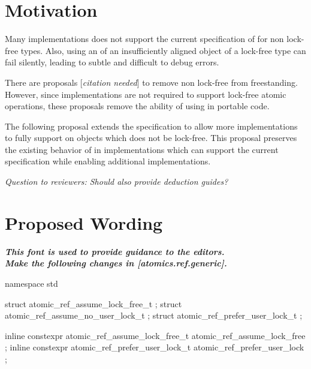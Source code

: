 \section*{Motivation}

Many implementations does not support the current specification of 
for non lock-free types.  Also, using an  of an insufficiently aligned object 
of a lock-free type can fail silently, leading to subtle and difficult to debug
errors.

There are proposals [\textit{citation needed}] to remove non lock-free 
from freestanding.  However, since implementations are not required to support
lock-free atomic operations, these proposals remove the ability of using 
in portable code.

The following proposal extends the  specification to allow more
implementations to fully support  on objects which does not be 
lock-free.  This proposal preserves the existing behavior of 
in implementations which can support the current specification while enabling 
additional implementations.

\textit{Question to reviewers:  Should  also provide deduction guides?}


\section*{Proposed Wording}

\textbf{\textit{This font is used to provide guidance to the editors.}} \\

\textbf{\textit{Make the following changes in [atomics.ref.generic].}} \\

%
%

\begin{addedblock}
\begin{codeblock}
namespace std {
  struct atomic_ref_assume_lock_free_t    {};
  struct atomic_ref_assume_no_user_lock_t {};
  struct atomic_ref_prefer_user_lock_t    {};
  
  inline constexpr atomic_ref_assume_lock_free_t  atomic_ref_assume_lock_free {};
  inline constexpr atomic_ref_prefer_user_lock_t  atomic_ref_prefer_user_lock {};
}
\end{codeblock}
\end{addedblock}


